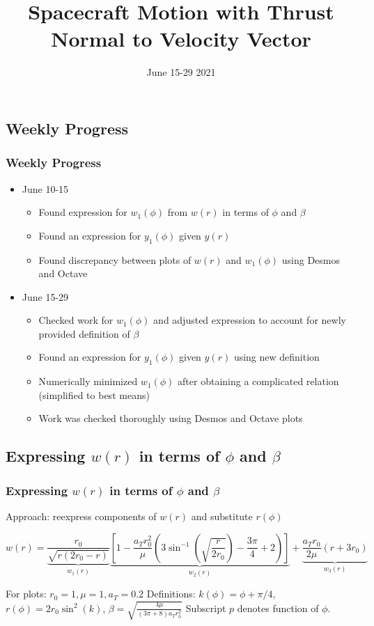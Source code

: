 \documentclass{beamer}
\title{Spacecraft Motion with Thrust Normal to Velocity Vector}
\date{June 15-29 2021}
\newcommand{\sectit}[1]{
    \section{\texorpdfstring{#1}{}}
    \frametitle{\texorpdfstring{#1}{}}
}
\begin{document}
\frame{\titlepage}

\begin{frame}

\sectit{Weekly Progress}

\begin{itemize}
    \item June 10-15
    \begin{itemize}
        \item Found expression for $w_1(\phi)$ from $w(r)$ in terms of $\phi$ and $\beta$
        \item Found an expression for $y_1(\phi)$ given $y(r)$
        \item Found discrepancy between plots of $w(r)$ and $w_1(\phi)$ using Desmos and Octave
    \end{itemize}
    \item June 15-29
    \begin{itemize}
        \item Checked work for $w_1(\phi)$ and adjusted expression to account for newly provided definition of $\beta$
        \item Found an expression for $y_1(\phi)$ given $y(r)$ using new definition
        \item Numerically minimized $w_1(\phi)$ after obtaining a complicated relation (simplified to best means)
        \item Work was checked thoroughly using Desmos and Octave plots
    \end{itemize}
\end{itemize}

\end{frame}

\begin{frame}
    \sectit{Expressing $w(r)$ in terms of $\phi$ and $\beta$}

    Approach: reexpress components of $w(r)$ and substitute $r(\phi)$

    
    {\scriptsize{$$
    w(r)=\underbrace{\frac{r_{0}}{\sqrt{r\left(2 r_{0}-r\right)}}}_{w_1(r)}
        \underbrace{\left[1-\frac{a_{T} r_{0}^{2}}{\mu}\left(3 \sin ^{-1}\left(\sqrt{\frac{r}{2 r_{0}}}\right)-\frac{3 \pi}{4}+2\right)\right]}_{w_2(r)}
        +\underbrace{\frac{a_{T} r_{0}}{2 \mu}\left(r+3 r_{0}\right)}_{w_3(r)}
    $$}}

    For plots: $r_0=1, \mu=1, a_T=0.2$\newline
    Definitions: $k(\phi)=\phi+\pi/4$, $r(\phi)=2r_0\sin^2(k)$, $\beta=\sqrt{\frac{4\mu}{(3\pi+8)a_Tr_0^2}}$\newline
    Subscript $p$ denotes function of $\phi$.

\end{frame}
\end{document}
